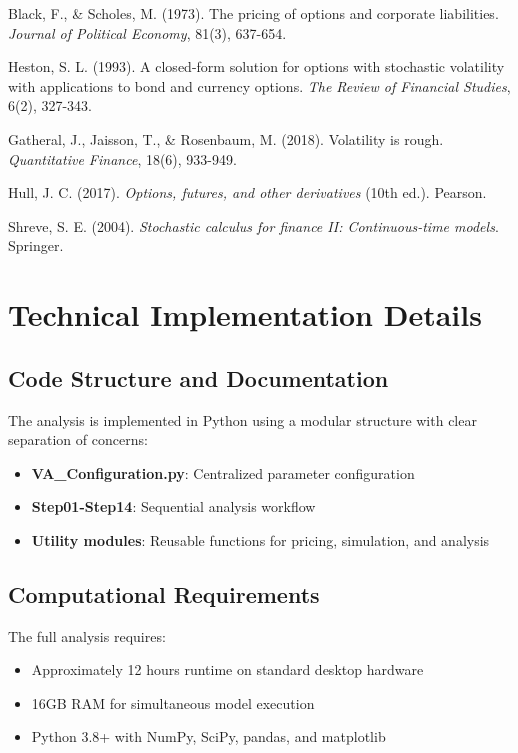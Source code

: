 \documentclass[12pt,a4paper]{report}
\begin{document}
\begin{thebibliography}{99}

 Black, F., \& Scholes, M. (1973). The pricing of options and corporate liabilities. \textit{Journal of Political Economy}, 81(3), 637-654.

 Heston, S. L. (1993). A closed-form solution for options with stochastic volatility with applications to bond and currency options. \textit{The Review of Financial Studies}, 6(2), 327-343.

 Gatheral, J., Jaisson, T., \& Rosenbaum, M. (2018). Volatility is rough. \textit{Quantitative Finance}, 18(6), 933-949.

 Hull, J. C. (2017). \textit{Options, futures, and other derivatives} (10th ed.). Pearson.

 Shreve, S. E. (2004). \textit{Stochastic calculus for finance II: Continuous-time models}. Springer.

\end{thebibliography}

\appendix

\chapter{Technical Implementation Details}

\section{Code Structure and Documentation}

The analysis is implemented in Python using a modular structure with clear separation of concerns:

\begin{itemize}
\item \textbf{VA\_Configuration.py}: Centralized parameter configuration
\item \textbf{Step01-Step14}: Sequential analysis workflow  
\item \textbf{Utility modules}: Reusable functions for pricing, simulation, and analysis
\end{itemize}

\section{Computational Requirements}

The full analysis requires:
\begin{itemize}
\item Approximately 12 hours runtime on standard desktop hardware
\item 16GB RAM for simultaneous model execution
\item Python 3.8+ with NumPy, SciPy, pandas, and matplotlib
\end{itemize}
\end{document}
